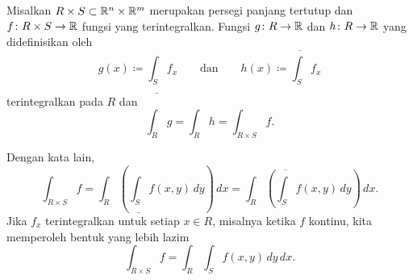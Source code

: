 \begin{thm} \label{mv:fubinivA} 
Misalkan $R \times S \subset {\mathbb{R}}^n \times {\mathbb{R}}^m$ merupakan persegi panjang
tertutup dan $f \colon R \times S \to {\mathbb{R}}$ fungsi yang terintegralkan. Fungsi
$g \colon R \to {\mathbb{R}}$ dan $h \colon R \to {\mathbb{R}}$ yang didefinisikan oleh
\begin{equation*}
g(x) \coloneqq \underline{\int_S} f_x \qquad
\text{dan} \qquad
h(x) \coloneqq \overline{\int_S} f_x 
\end{equation*}
terintegralkan pada $R$ dan
\begin{equation*}
\int_R g = \int_R h = \int_{R \times S} f .
\end{equation*}
\end{thm}

Dengan kata lain,
\begin{equation*}
\int_{R \times S} f
=
 \int_R \left(
 \underline{\int_S} f(x,y) \, dy
\right) \, dx
=
 \int_R \left(
 \overline{\int_S} f(x,y) \, dy
\right) \, dx .
\end{equation*}
Jika $f_x$ terintegralkan untuk setiap $x \in R$, misalnya ketika $f$ kontinu, kita
memperoleh bentuk yang lebih lazim
\begin{equation*}
\int_{R \times S} f
=
 \int_R \int_S f(x,y) \, dy \, dx .
\end{equation*}

